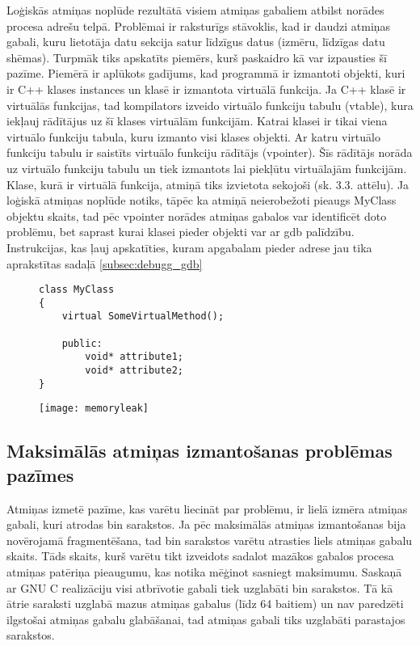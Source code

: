 Loģiskās atmiņas noplūde rezultātā visiem atmiņas gabaliem atbilst norādes procesa adrešu telpā.
Problēmai ir raksturīgs stāvoklis, kad ir daudzi atmiņas gabali, kuru lietotāja datu sekcija satur līdzīgus datus (izmēru, līdzīgas datu shēmas).
Turpmāk tiks apskatīts piemērs, kurš paskaidro kā var izpausties šī pazīme.
Piemērā ir aplūkots gadījums, kad programmā ir izmantoti objekti, kuri ir  C++ klases instances un klasē ir izmantota virtuālā funkcija.
Ja C++ klasē ir virtuālās funkcijas, tad kompilators izveido virtuālo funkciju tabulu (vtable), kura iekļauj rādītājus uz šī klases virtuālām funkcijām.
 Katrai klasei ir tikai viena virtuālo funkciju tabula, kuru izmanto visi klases objekti.
 Ar katru virtuālo funkciju tabulu ir saistīts virtuālo funkciju rādītājs (vpointer).
 Šīs rādītājs norāda uz virtuālo funkciju tabulu un tiek izmantots lai piekļūtu virtuālajām funkcijām.
Klase, kurā ir virtuālā funkcija, atmiņā tiks izvietota sekojoši (sk. 3.3. attēlu).
Ja loģiskā atmiņas noplūde notiks, tāpēc ka atmiņā neierobežoti pieaugs MyClass objektu skaits, tad pēc vpointer norādes atmiņas gabalos var identificēt doto problēmu, bet saprast kurai klasei pieder objekti var ar gdb palīdzību.
Instrukcijas, kas ļauj apskatīties, kuram apgabalam pieder adrese jau tika aprakstītas sadaļā \ref{subsec:debugg_gdb}
\begin{figure}[h]
\begin{lstlisting}
class MyClass
{
    virtual SomeVirtualMethod();

    public:
        void* attribute1;
        void* attribute2;
}
\end{lstlisting}
\end{figure}
\begin{figure}[h]
\begin{center}
\texttt{[image: memoryleak]}
\end{center}
\caption{\textbf{\fontsize{11}{12}\selectfont {C++ klases ar virtuālo funkciju izvietojums atmiņā }}}
\label{fig:memoryleak}
\end{figure}



\subsection{Maksimālās atmiņas izmantošanas problēmas pazīmes}
Atmiņas izmetē pazīme, kas varētu liecināt par problēmu, ir lielā izmēra atmiņas gabali, kuri atrodas bin sarakstos.
Ja pēc maksimālās atmiņas izmantošanas bija novērojamā fragmentēšana, tad bin sarakstos varētu atrasties liels atmiņas gabalu skaits.
Tāds skaits, kurš varētu tikt izveidots sadalot mazākos gabalos procesa atmiņas patēriņa pieaugumu, kas notika mēģinot sasniegt maksimumu.
Saskaņā ar GNU C realizāciju visi atbrīvotie gabali tiek uzglabāti bin sarakstos.
Tā kā ātrie saraksti uzglabā mazus atmiņas gabalus (līdz 64 baitiem) un nav paredzēti ilgstošai atmiņas gabalu glabāšanai, tad atmiņas gabali tiks uzglabāti parastajos sarakstos.

